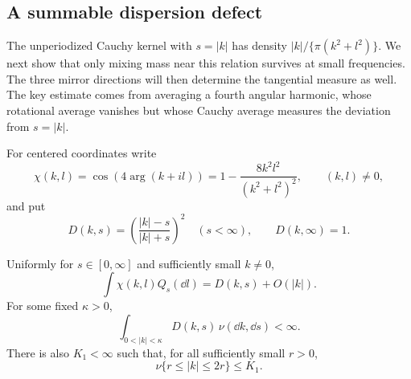 \subsection{A summable dispersion defect}

The unperiodized Cauchy kernel with $s=|k|$ has density
$|k|/\{\pi(k^2+l^2)\}$.  We next show that only mixing mass near this
relation survives at small frequencies.  The three mirror directions
will then determine the tangential measure as well.  The key estimate
comes from averaging a fourth angular harmonic, whose rotational average
vanishes but whose Cauchy average measures the deviation from $s=|k|$.

For centered coordinates write
\[
 \chi(k,l)=\cos(4\arg(k+il))
   =1-\frac{8k^2l^2}{(k^2+l^2)^2},\qquad (k,l)\ne0,
\]
and put
\[
 D(k,s)=\left(\frac{|k|-s}{|k|+s}\right)^2\quad(s<\infty),
 \qquad D(k,\infty)=1.
\]

\begin{lemma}
\label{plane:lem:defect}
Uniformly for $s\in[0,\infty]$ and sufficiently small $k\ne0$,
\begin{equation}
 \label{plane:eq:poisson}
 \int\chi(k,l)Q_s(\dd l)=D(k,s)+O(|k|).
\end{equation}
For some fixed $\kappa>0$,
\begin{equation}
 \label{plane:eq:defect}
 \int_{0<|k|<\kappa}D(k,s)\,\nu(\dd k,\dd s)<\infty.
\end{equation}
There is also $K_1<\infty$ such that, for all sufficiently small $r>0$,
\begin{equation}
 \label{plane:eq:bands}
 \nu\{r\le|k|\le2r\}\le K_1.
\end{equation}
\end{lemma}


